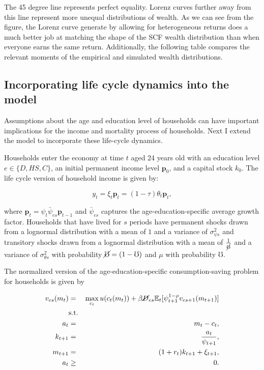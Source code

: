 \par The 45 degree line represents perfect equality. Lorenz curves further away from this line represent more unequal distributions of wealth. As we can see from the figure, the Lorenz curve generate by allowing for heterogeneous returns does a much better job at matching the shape of the SCF wealth distribution than when everyone earns the same return. Additionally, the following table compares the relevant moments of the empirical and simulated wealth distributions.



\FloatBarrier

\subsection{Incorporating life cycle dynamics into the model}

\par Assumptions about the age and education level of households can have important implications for the income and mortality process of households. Next I extend the model to incorporate these life-cycle dynamics.

\par Households enter the economy at time $t$ aged 24 years old with an education level $e \in \{D,HS,C\}$, an initial permanent income level $\textbf{p}_0$, and a capital stock $k_0$. The life cycle version of household income is given by:

$$ y_t = \xi_t \textbf{p}_t = (1 - \tau) \theta_t \textbf{p}_t, $$

where $\textbf{p}_t = \psi_t \bar{\psi}_{es} \textbf{p}_{t-1}$ and $\bar{\psi}_{es}$ captures the age-education-specific average growth factor. Households that have lived for $s$ periods have permanent shocks drawn from a lognormal distribution with a mean of $1$ and a variance of $\sigma^{2}_{\psi s}$ and transitory shocks drawn from a lognormal distribution with a mean of $\frac{1}{\cancel{\mho}}$ and a variance of $\sigma^{2}_{\theta s}$ with probability $\cancel{\mho} = (1-\mho)$ and $\mu$ with probability $\mho$.

\par The normalized version of the age-education-specific consumption-saving problem for households is given by

\begin{eqnarray*}
  v_{es}(m_t) &=& \max_{c_t} u(c_t(m_t)) + \beta \cancel{D}_{es} \mathbb{E}_{t}[\psi_{t+1}^{1-\rho}v_{es + 1}(m_{t+1})] \\
  &\text{s.t.}& \\
  a_t &=& m_t - c_t, \\
  k_{t+1} &=& \frac{a_t}{\psi_{t+1}}, \\
  m_{t+1} &=& (1 + r_t)k_{t+1} + \xi_{t+1}, \\
  a_t &\geq& 0.
\end{eqnarray*}

